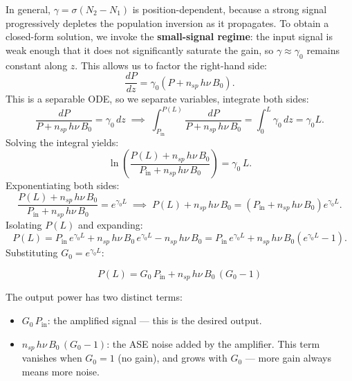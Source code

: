 In general, $\gamma = \sigma(N_2 - N_1)$ is position-dependent, because a strong signal progressively depletes the population inversion as it propagates. To obtain a closed-form solution, we invoke the \textbf{small-signal regime}: the input signal is weak enough that it does not significantly saturate the gain, so $\gamma \approx \gamma_0$ remains constant along $z$. This allows us to factor the right-hand side:
\begin{equation*}
    \frac{dP}{dz} = \gamma_0\!\left(P + n_{sp}\,h\nu\,B_0\right).
\end{equation*}
This is a separable ODE, so we separate variables, integrate both sides:
\begin{equation*}
    \frac{dP}{P + n_{sp}\,h\nu\,B_0} = \gamma_0\,dz
    \;\implies\;
    \int_{P_\text{in}}^{P(L)} \frac{dP}{P + n_{sp}\,h\nu\,B_0} = \int_0^L \gamma_0\,dz = \gamma_0 L.
\end{equation*}
Solving the integral yields:
\begin{equation*}
    \ln\!\left(\frac{P(L) + n_{sp}\,h\nu\,B_0}{P_\text{in} + n_{sp}\,h\nu\,B_0}\right) = \gamma_0\,L.
\end{equation*}
Exponentiating both sides:
\begin{equation*}
    \frac{P(L) + n_{sp}\,h\nu\,B_0}{P_\text{in} + n_{sp}\,h\nu\,B_0} = e^{\gamma_0 L}
    \;\implies\;
    P(L) + n_{sp}\,h\nu\,B_0 = \left(P_\text{in} + n_{sp}\,h\nu\,B_0\right)e^{\gamma_0 L}.
\end{equation*}
Isolating $P(L)$ and expanding:
\begin{equation*}
    P(L) = P_\text{in}\,e^{\gamma_0 L} + n_{sp}\,h\nu\,B_0\,e^{\gamma_0 L} - n_{sp}\,h\nu\,B_0
    = P_\text{in}\,e^{\gamma_0 L} + n_{sp}\,h\nu\,B_0\!\left(e^{\gamma_0 L} - 1\right).
\end{equation*}
Substituting $G_0 = e^{\gamma_0 L}$:
\begin{keyresult}
    \begin{equation}
        P(L) = G_0\,P_\text{in} + n_{sp}\,h\nu\,B_0\,(G_0 - 1)
    \end{equation}
\end{keyresult}

The output power has two distinct terms:
\begin{itemize}
    \item $G_0\,P_\text{in}$: the amplified signal — this is the desired output.
    \item $n_{sp}\,h\nu\,B_0\,(G_0 - 1)$: the ASE noise added by the amplifier. This term vanishes when $G_0 = 1$ (no gain), and grows with $G_0$ — more gain always means more noise.
\end{itemize}

